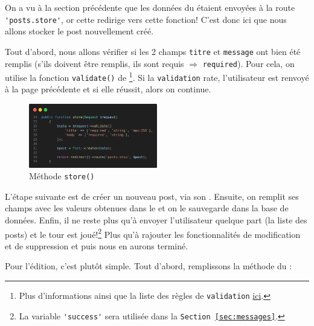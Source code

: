\newpage

\label{sec:posts_store}

On a vu à la section précédente que les données du \form{} étaient envoyées à la route \verb|'posts.store'|, or cette \route{} redirige vers cette fonction! C'est donc ici que nous allons stocker le post nouvellement créé.

Tout d'abord, nous allons vérifier si les 2 champs \verb|titre| et \verb|message| ont bien été remplis (s'ils doivent être remplis, ils sont requis $\Rightarrow$ \verb|required|). Pour cela, on utilise la fonction \verb|validate()| de \laravel\footnote{Plus d'informations ainsi que la liste des règles de \texttt{validation} \href{https://laravel.com/docs/12.x/validation#quick-writing-the-validation-logic}{ici}.}. Si la \texttt{validation} rate, l'utilisateur est renvoyé à la page précédente et si elle réussit, alors on continue.

\begin{figure}
    \vspace{-0.5cm}
    \includegraphics[width=0.5\textwidth]{figures-C1/postscontroller_store.png}
    \caption{Méthode \texttt{store()}}
\end{figure}
L'étape suivante est de créer un nouveau post, via son \model{}. Ensuite, on remplit ses champs avec les valeurs obtenues dans le \form{} et on le sauvegarde dans la base de données. Enfin, il ne reste plus qu'à envoyer l'utilisateur quelque part (la liste des posts) et le tour est joué!\footnote{La variable \verb|'success'| sera utilisée dans la \texttt{Section~\ref{sec:messages}}.} Plus qu'à rajouter les fonctionnalités de modification et de suppression et puis nous en aurons terminé.

\vspace{1.5cm}

Pour l'édition, c'est plutôt simple. Tout d'abord, remplissons la méthode du \controller{}:
\vspace{1cm}

